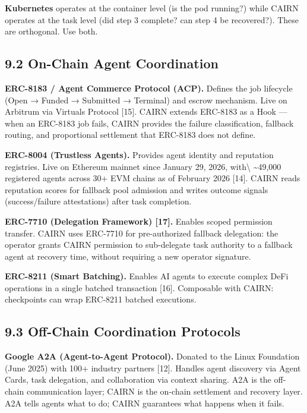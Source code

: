 \documentclass[
  10pt,
]{article}
\begin{document}
\textbf{Kubernetes} operates at the container level (is the pod
running?) while CAIRN operates at the task level (did step 3 complete?
can step 4 be recovered?). These are orthogonal. Use both.

\hypertarget{on-chain-agent-coordination}{%
\subsection{9.2 On-Chain Agent
Coordination}\label{on-chain-agent-coordination}}

\textbf{ERC-8183 / Agent Commerce Protocol (ACP).} Defines the job
lifecycle (Open → Funded → Submitted → Terminal) and escrow mechanism.
Live on Arbitrum via Virtuals Protocol {[}15{]}. CAIRN extends ERC-8183
as a Hook --- when an ERC-8183 job fails, CAIRN provides the failure
classification, fallback routing, and proportional settlement that
ERC-8183 does not define.

\textbf{ERC-8004 (Trustless Agents).} Provides agent identity and
reputation registries. Live on Ethereum mainnet since January 29, 2026,
with\textbackslash{} \textasciitilde49,000 registered agents across 30+
EVM chains as of February 2026 {[}14{]}. CAIRN reads reputation scores
for fallback pool admission and writes outcome signals (success/failure
attestations) after task completion.

\textbf{ERC-7710 (Delegation Framework) {[}17{]}.} Enables scoped
permission transfer. CAIRN uses ERC-7710 for pre-authorized fallback
delegation: the operator grants CAIRN permission to sub-delegate task
authority to a fallback agent at recovery time, without requiring a new
operator signature.

\textbf{ERC-8211 (Smart Batching).} Enables AI agents to execute complex
DeFi operations in a single batched transaction {[}16{]}. Composable
with CAIRN: checkpoints can wrap ERC-8211 batched executions.

\hypertarget{off-chain-coordination-protocols}{%
\subsection{9.3 Off-Chain Coordination
Protocols}\label{off-chain-coordination-protocols}}

\textbf{Google A2A (Agent-to-Agent Protocol).} Donated to the Linux
Foundation (June 2025) with 100+ industry partners {[}12{]}. Handles
agent discovery via Agent Cards, task delegation, and collaboration via
context sharing. A2A is the off-chain communication layer; CAIRN is the
on-chain settlement and recovery layer. A2A tells agents what to do;
CAIRN guarantees what happens when it fails.
\end{document}
